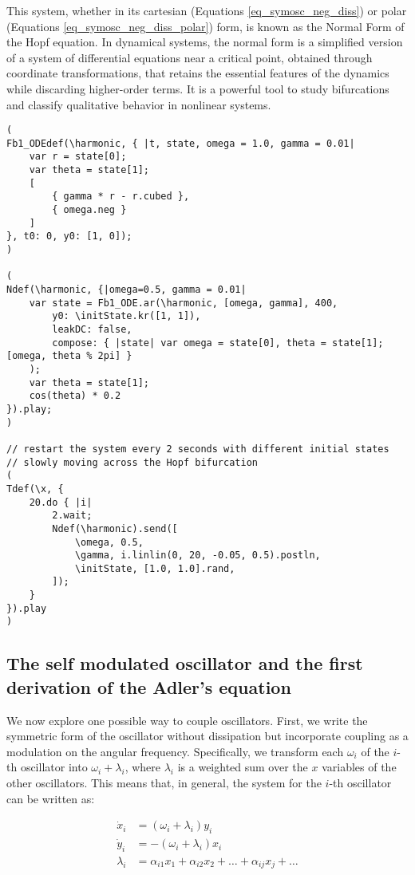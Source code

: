 \documentclass{article}
\begin{document}
This system, whether in its cartesian (Equations {\ref{eq_symosc_neg_diss}}) or polar (Equations \ref{eq_symosc_neg_diss_polar}) form, is known as the Normal Form of the Hopf equation. 
In dynamical systems, the normal form is a simplified version of a system of differential equations near a critical point, obtained through coordinate transformations, that retains the essential features of the dynamics while discarding higher-order terms. 
It is a powerful tool to study bifurcations and classify qualitative behavior in nonlinear systems.


\begin{lstlisting}[caption=Exploring the Hopf bifurcation of a self-oscillator.]
(
Fb1_ODEdef(\harmonic, { |t, state, omega = 1.0, gamma = 0.01|
	var r = state[0];
	var theta = state[1];
	[
		{ gamma * r - r.cubed },
		{ omega.neg }
	]
}, t0: 0, y0: [1, 0]);
)

(
Ndef(\harmonic, {|omega=0.5, gamma = 0.01|
	var state = Fb1_ODE.ar(\harmonic, [omega, gamma], 400,
		y0: \initState.kr([1, 1]),
		leakDC: false,
		compose: { |state| var omega = state[0], theta = state[1]; [omega, theta % 2pi] }
	);
	var theta = state[1];
	cos(theta) * 0.2
}).play;
)

// restart the system every 2 seconds with different initial states
// slowly moving across the Hopf bifurcation
(
Tdef(\x, {
	20.do { |i|
		2.wait;
		Ndef(\harmonic).send([
			\omega, 0.5,
			\gamma, i.linlin(0, 20, -0.05, 0.5).postln,
			\initState, [1.0, 1.0].rand,
		]);
	}
}).play
)

\end{lstlisting}


\subsection{The self modulated oscillator and the first derivation of the Adler's equation}

We now explore one possible way to couple oscillators. 
First, we write the symmetric form of the oscillator without dissipation but incorporate coupling as a modulation on the angular frequency. 
Specifically, we transform each $\omega_i$ of the $i$-th oscillator into $\omega_i + \lambda_i$, where $\lambda_i$ is a weighted sum over the $x$ variables of the other oscillators. 
This means that, in general, the system for the $i$-th oscillator can be written as:

\begin{subequations} \label{eq_coupled_oscillators}
\begin{align}
    \dot{x}_i & = (\omega_i + \lambda_i) y_i \\
    \dot{y}_i & = -(\omega_i + \lambda_i) x_i \\
    \lambda_i & = \alpha_{i1} x_1 + \alpha_{i2} x_2 + \dots + \alpha_{ij} x_j + \dots
\end{align}
\end{subequations}
\end{document}
